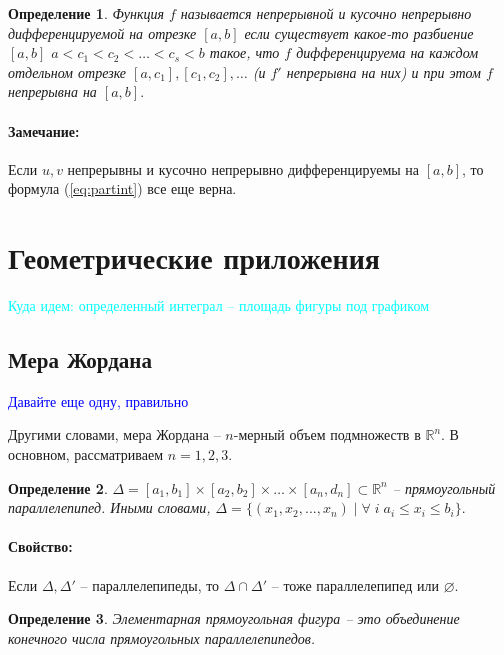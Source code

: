 \documentclass{article}
\theoremstyle{plain}
\newtheorem{definition}{Определение}
\theoremstyle{definition}
\theoremstyle{remark}
\renewcommand{\*}{\cdot}
\begin{document}
\begin{definition}
Функция $f$ называется непрерывной и кусочно непрерывно дифференцируемой на отрезке $[a,b]$ если существует какое-то разбиение $[a,b]$ $a<c_1 < c_2 < \ldots < c_{s} < b$
такое, что $f$ дифференцируема на каждом отдельном отрезке $[a, c_1], [c_1, c_2], \ldots $ (и $f'$ непрерывна на них) и при этом $f$ непрерывна на $[a, b].$
\end{definition}

\paragraph{Замечание:} Если $u, v$ непрерывны и кусочно непрерывно дифференцируемы на $[a, b]$, то формула (\ref{eq:partint}) все еще верна.

\section{Геометрические приложения}
\textcolor{cyan}{Куда идем: определенный интеграл -- площадь фигуры под графиком}

\subsection{Мера Жордана}
\textcolor{blue}{Давайте еще одну, правильно}


Другими словами, мера Жордана -- $n$-мерный объем подмножеств в $\mathbb{R}^n$. В основном, рассматриваем $n=1,2,3$.

\begin{definition}
$\Delta = [a_1, b_1] \times [a_2, b_2]\times \ldots \times[a_n, d_n] \subset \mathbb{R}^n$ -- прямоугольный параллелепипед.
Иными словами, $\Delta = \{(x_1, x_2, ... , x_n)\;|\; \forall\; i \; a_i \leq x_i \leq b_i\}.$
\end{definition}

\paragraph{Свойство:} Если $\Delta, \Delta'$ -- параллелепипеды, то $\Delta \cap \Delta'$ -- тоже параллелепипед или $\varnothing$.

\begin{definition}
Элементарная прямоугольная фигура -- это объединение конечного числа прямоугольных параллелепипедов. 
\end{definition}
\end{document}
